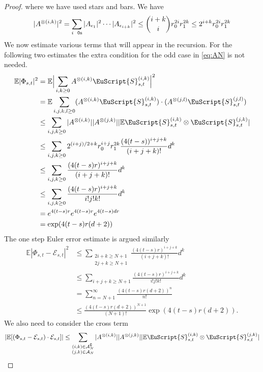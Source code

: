 \documentclass{article}
\def\Sig{\EuScript{S}}
\def\cE{\mathcal{E}}
\numberwithin{equation}{section}
\theoremstyle{definition}
\theoremstyle{remark}
\begin{document}
\begin{proof}
where we have used stars and bars. We have
\begin{align*}
|A^{\otimes(i,k)}|^2 = \sum_{\text{$i$ \ \texttt{0}s}} |A_{\epsilon_1}|^2 \cdots |A_{\epsilon_{i+k}}|^2 \leq \binom{i+k}{i} r_0^{2i} r_1^{2k} \leq 2^{i+k}r_0^{2i} r_1^{2k}
\end{align*}	
We now estimate various terms that will appear in the recursion. For the following two estimates the extra condition for the odd case in \eqref{eq:AN} is not needed.
\begin{align*}
	\mathbb E |\Phi_{s,t}|^2 &= \mathbb E \Big| \sum_{i,k \geq 0} A^{\otimes (i,k)}     \Sig^{(i,k)}_{s,t} \Big|^2 \\
	&= \mathbb E \sum_{i,j,k,l \geq 0}  (A^{\otimes(i,k)}    \Sig^{(i,k)}_{s,t}) \cdot (A^{\otimes(j,l)}    \Sig^{(j,l)}_{s,t}) \\
	&\leq  \sum_{i,j,k \geq 0} |A^{\otimes (i,k)}| |A^{\otimes (j,k)}| |\mathbb E \Sig^{(i,k)}_{s,t} \otimes \Sig^{(j,k)}_{s,t}| \\
	&\leq  \sum_{i,j,k \geq 0} 2^{(i+j)/2 + k} r_0^{i+j} r_1^{2k}\frac{(4(t-s))^{i+j+k}}{(i+j+k)!} d^k \\
	&\leq  \sum_{i,j,k \geq 0} \frac{(4(t-s)r)^{i+j+k}}{(i+j+k)!} d^k \\
	&\leq  \sum_{i,j,k \geq 0} \frac{(4(t-s)r)^{i+j+k}}{i!j!k!} d^k \\
	&=   e^{4(t-s)r}e^{4(t-s)r}e^{4(t-s)dr} \\
	&=   \exp(4(t-s)r(d+2))
\end{align*}
The one step Euler error estimate is argued similarly
\begin{align*}
	\mathbb E|\Phi_{s,t} -\cE_{s,t}|^2 &\leq  \sum_{\substack{2i + k \geq N + 1 \\ 2j + k \geq N + 1}} \frac{(4(t-s)r)^{i+j+k}}{(i+j+k)!} d^k \\
	&\leq  \sum_{i+j+k \geq N+1} \frac{(4(t-s)r)^{i+j+k}}{i!j!k!} d^k \\
	&=  \sum_{n = N+1}^\infty \frac{(4(t-s)r(d+2))^n}{n!} \\
	&\leq  \frac{(4(t-s)r(d+2))^{N+1}}{(N+1)!}\exp(4(t-s)r(d+2)).
\end{align*}
We also need to consider the cross term
\begin{align*}
	|\mathbb E[(\Phi_{s, t} - \mathcal E_{s,t}) \cdot \mathcal E_{s,t}]|
	&\leq  \sum_{\substack{(i,k) \in \mathcal A_N^\complement \\ (j,k) \in \mathcal A_N}} |A^{\otimes (i,k)}||A^{\otimes(j,k)}||\mathbb E \Sig^{(i,k)}_{s,t} \otimes \Sig^{(j,k)}_{s,t}| \\

\end{align*}
\end{proof}
\end{document}
